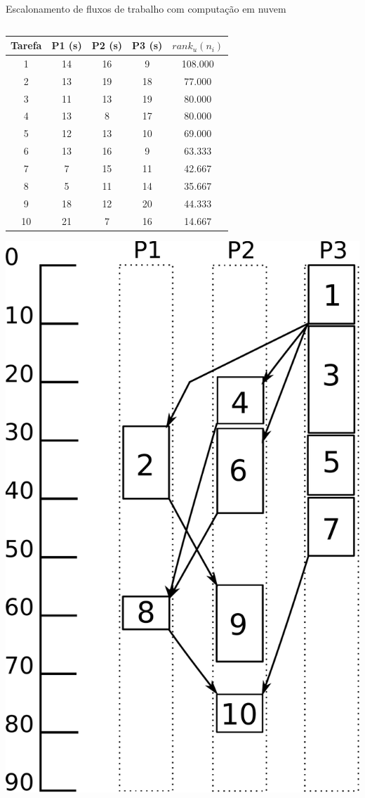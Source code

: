 \documentclass[final]{beamer}
\begin{document}
\begin{frame}[t]
\begin{columns}[t]
\begin{column}{0.60\paperwidth}
\begin{block}{Escalonamento de fluxos de trabalho com computação em nuvem}
\begin{columns}[totalwidth=0.60\paperwidth]
\begin{column}{0.28\paperwidth}
			\begin{table}[ht]
			\centering
			\begin{tabular}{|c|c|c|c|c|}
			\hline
			\textbf{Tarefa} & \textbf{P1 (s)} & \textbf{P2 (s)} & \textbf{P3 (s)} & $rank_u(n_i)$ \\ \hline
			1               & 14          & 16          & 9           & 108.000       \\
			2               & 13          & 19          & 18          & 77.000        \\
			3               & 11          & 13          & 19          & 80.000        \\
			4               & 13          & 8           & 17          & 80.000        \\
			5               & 12          & 13          & 10          & 69.000        \\
			6               & 13          & 16          & 9           & 63.333        \\
			7               & 7           & 15          & 11          & 42.667        \\
			8               & 5           & 11          & 14          & 35.667        \\
			9               & 18          & 12          & 20          & 44.333        \\
			10              & 21          & 7           & 16          & 14.667        \\ \hline
			\end{tabular}
			\end{table}		

			\begin{center}
				\includegraphics[width=0.42\columnwidth]{escalonamento_heft.pdf}
			\end{center}	
		\end{column}
		\end{columns}


\end{block}
\end{column}
\end{columns}
\end{frame}
\end{document}
